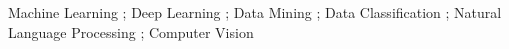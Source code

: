 


\begin{cvparagraph}

Machine Learning ;
Deep Learning ; 
Data Mining ;
Data Classification ;
Natural Language Processing ;
Computer Vision 
\end{cvparagraph}
